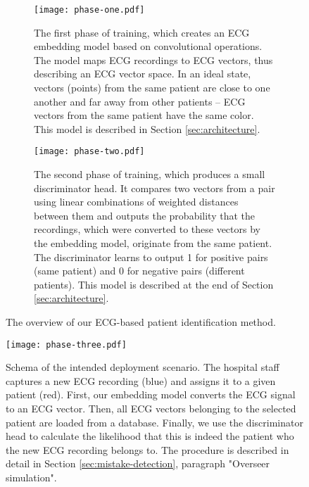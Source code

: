 \documentclass[preprint,12pt]{elsarticle}
\begin{document}
\begin{figure}
    \centering
    \begin{subfigure}[b]{\textwidth}
    \centering
    \texttt{[image: phase-one.pdf]}
    \caption{The first phase of training, which creates an ECG embedding model based on convolutional operations. The model maps ECG recordings to ECG vectors, thus describing an ECG vector space. In an ideal state, vectors (points) from the same patient are close to one another and far away from other patients -- ECG vectors from the same patient have the same color. This model is described in Section \ref{sec:architecture}.}
    \label{fig:overview-p1}
            \vspace*{7mm}
    \end{subfigure}
    \begin{subfigure}[b]{\textwidth}
    \centering
    \texttt{[image: phase-two.pdf]}
    \caption{The second phase of training, which produces a small discriminator head. It compares two vectors from a pair using linear combinations of weighted distances between them and outputs the probability that the recordings, which were converted to these vectors by the embedding model, originate from the same patient. The discriminator learns to output 1 for positive pairs (same patient) and 0 for negative pairs (different patients). This model is described at the end of Section \ref{sec:architecture}.}
    \label{fig:overview-p2}
            \vspace*{7mm}
    \end{subfigure}
    \caption{The overview of our ECG-based patient identification method.}
    \label{fig:overview}
\end{figure}

\begin{figure}[h]
    \centering
    \texttt{[image: phase-three.pdf]}
    \caption{Schema of the intended deployment scenario. The hospital staff captures a new ECG recording (blue) and assigns it to a given patient (red). First, our embedding model converts the ECG signal to an ECG vector. Then, all ECG vectors belonging to the selected patient are loaded from a database. Finally, we use the discriminator head to calculate the likelihood that this is indeed the patient who the new ECG recording belongs to. The procedure is described in detail in Section \ref{sec:mistake-detection}, paragraph "Overseer simulation".}
    \label{fig:overview-p3}
\end{figure}
\end{document}
